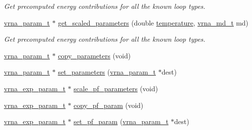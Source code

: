 \begin{DoxyCompactItemize}
\begin{DoxyCompactList}\small\item\em Get precomputed energy contributions for all the known loop types. \end{DoxyCompactList}\item 
\mbox{\hyperlink{group__energy__parameters_ga8a69ca7d787e4fd6079914f5343a1f35}{vrna\+\_\+param\+\_\+t}} $\ast$ \mbox{\hyperlink{group__energy__parameters_ga7fa6a000d7c16feab939f2c4ee626197}{get\+\_\+scaled\+\_\+parameters}} (double \mbox{\hyperlink{group__model__details_gab4b11c8d9c758430960896bc3fe82ead}{temperature}}, \mbox{\hyperlink{group__model__details_ga1f8a10e12a0a1915f2a4eff0b28ea17c}{vrna\+\_\+md\+\_\+t}} md)
\begin{DoxyCompactList}\small\item\em Get precomputed energy contributions for all the known loop types. \end{DoxyCompactList}\item 
\mbox{\hyperlink{group__energy__parameters_ga8a69ca7d787e4fd6079914f5343a1f35}{vrna\+\_\+param\+\_\+t}} $\ast$ \mbox{\hyperlink{group__energy__parameters_gac2f6521f9db04ede2f23fc56cc9fa7e5}{copy\+\_\+parameters}} (void)
\item 
\mbox{\hyperlink{group__energy__parameters_ga8a69ca7d787e4fd6079914f5343a1f35}{vrna\+\_\+param\+\_\+t}} $\ast$ \mbox{\hyperlink{group__energy__parameters_gac5889dd7be0201c76ebdd1c501cdff54}{set\+\_\+parameters}} (\mbox{\hyperlink{group__energy__parameters_ga8a69ca7d787e4fd6079914f5343a1f35}{vrna\+\_\+param\+\_\+t}} $\ast$dest)
\item 
\mbox{\hyperlink{group__energy__parameters_ga01d8b92fe734df8d79a6169482c7d8d8}{vrna\+\_\+exp\+\_\+param\+\_\+t}} $\ast$ \mbox{\hyperlink{group__energy__parameters_ga32414ddbb3ff0aa35d18ad8e002aad5a}{scale\+\_\+pf\+\_\+parameters}} (void)
\item 
\mbox{\hyperlink{group__energy__parameters_ga01d8b92fe734df8d79a6169482c7d8d8}{vrna\+\_\+exp\+\_\+param\+\_\+t}} $\ast$ \mbox{\hyperlink{group__energy__parameters_ga00bcbd1e68465def3dabc12c213372cb}{copy\+\_\+pf\+\_\+param}} (void)
\item 
\mbox{\hyperlink{group__energy__parameters_ga01d8b92fe734df8d79a6169482c7d8d8}{vrna\+\_\+exp\+\_\+param\+\_\+t}} $\ast$ \mbox{\hyperlink{group__energy__parameters_ga106a2beb5026a25bfa90fd59b8b1d5b7}{set\+\_\+pf\+\_\+param}} (\mbox{\hyperlink{group__energy__parameters_ga8a69ca7d787e4fd6079914f5343a1f35}{vrna\+\_\+param\+\_\+t}} $\ast$dest)
\end{DoxyCompactItemize}


